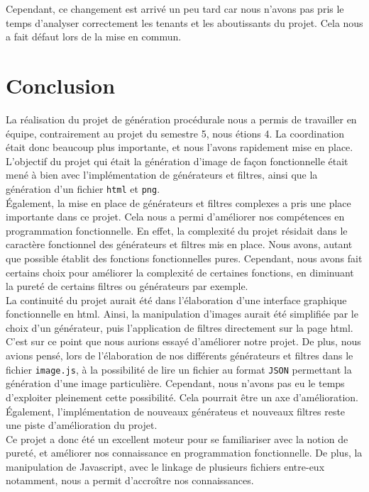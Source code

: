 \documentclass[11pt]{article}
\begin{document}
Cependant, ce changement est arrivé un peu tard car nous n'avons pas pris le temps d'analyser correctement les tenants et les aboutissants du projet. Cela nous a fait défaut lors de la mise en commun.

\newpage
\section{Conclusion}

La réalisation du projet de génération procédurale nous a permis de travailler en équipe, contrairement au projet du semestre 5, nous étions 4. La coordination était donc beaucoup plus importante, et nous l'avons rapidement mise en place. L'objectif du projet qui était la génération d'image de façon fonctionnelle était mené à bien avec l'implémentation de générateurs et filtres, ainsi que la génération d'un fichier \texttt{html} et \texttt{png}. \\

\'Egalement, la mise en place de générateurs et filtres complexes a pris une place importante dans ce projet. Cela nous a permi d'améliorer nos compétences en programmation fonctionnelle. En effet, la complexité du projet résidait dans le caractère fonctionnel des générateurs et filtres mis en place. Nous avons, autant que possible établit des fonctions fonctionnelles pures. Cependant, nous avons fait certains choix pour améliorer la complexité de certaines fonctions, en diminuant la pureté de certains filtres ou générateurs par exemple. \\

La continuité du projet aurait été dans l'élaboration d'une interface graphique fonctionnelle en html. Ainsi, la manipulation d'images aurait été simplifiée par le choix d'un générateur, puis l'application de filtres directement sur la page html. C'est sur ce point que nous aurions essayé d'améliorer notre projet. De plus, nous avions pensé, lors de l'élaboration de nos différents générateurs et filtres dans le fichier \texttt{image.js}, à la possibilité de lire un fichier au format \texttt{JSON} permettant la génération d'une image particulière. Cependant, nous n'avons pas eu le temps d'exploiter pleinement cette possibilité. Cela pourrait être un axe d'amélioration. \'Egalement, l'implémentation de nouveaux générateus et nouveaux filtres reste une piste d'amélioration du projet. \\

Ce projet a donc été un excellent moteur pour se familiariser avec la notion de pureté, et améliorer nos connaissance en programmation fonctionnelle. De plus, la manipulation de Javascript, avec le linkage de plusieurs fichiers entre-eux notamment, nous a permit d'accroître nos connaissances. \\

\newpage
\nocite{*}
 

\end{document}

